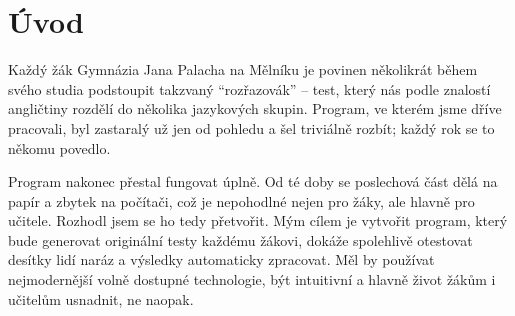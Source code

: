 \chapter*{Úvod}

Každý žák Gymnázia Jana Palacha na Mělníku je povinen několikrát během svého studia podstoupit takzvaný \enquote{rozřazovák} -- test, který nás podle znalostí angličtiny rozdělí do několika jazykových skupin. Program, ve kterém jsme dříve pracovali, byl zastaralý už jen od pohledu a šel triviálně rozbít; každý rok se to někomu povedlo.

Program nakonec přestal fungovat úplně. Od té doby se poslechová část dělá na papír a zbytek na počítači, což je nepohodlné nejen pro žáky, ale hlavně pro učitele. Rozhodl jsem se ho tedy přetvořit. Mým cílem je vytvořit program, který bude generovat originální testy každému žákovi, dokáže spolehlivě otestovat desítky lidí naráz a výsledky automaticky zpracovat. Měl by používat nejmodernější volně dostupné technologie, být intuitivní a hlavně život žákům i učitelům usnadnit, ne naopak.